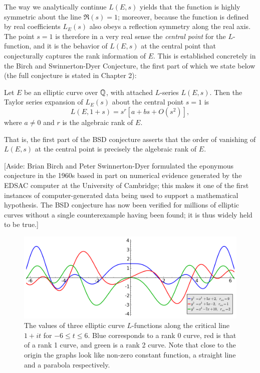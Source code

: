\documentclass[10pt]{article}
\begin{document}
The way we analytically continue $L(E,s)$ yields that the function is highly symmetric about the line $\Re(s)=1$; moreover, because the function is defined by real coefficients $L_E(s)$ also obeys a reflection symmetry along the real axis. The point $s=1$ is therefore in a very real sense the {\it central point} for the $L$-function, and it is the behavior of $L(E,s)$ at the central point that conjecturally captures the rank information of $E$. This is established concretely in the Birch and Swinnerton-Dyer Conjecture, the first part of which we state below (the full conjecture is stated in Chapter 2):

\begin{conjecture}
Let $E$ be an elliptic curve over $\mathbb{Q}$, with attached $L$-series $L(E,s)$. Then the Taylor series expansion of $L_E(s)$ about the central point $s=1$ is
\begin{equation}
L(E,1+s) = s^r\left[a  + bs + O(s^2)\right],
\end{equation}
where
$a \ne 0$ and $r$ is the algebraic rank of $E$.
\end{conjecture}
That is, the first part of the BSD conjecture asserts that the order of vanishing of $L(E,s)$ at the central point is precisely the algebraic rank of $E$.

[Aside: Brian Birch and Peter Swinnerton-Dyer formulated the eponymous conjecture in the 1960s based in part on numerical evidence generated by the EDSAC computer at the University of Cambridge; this makes it one of the first instances of computer-generated data being used to support a mathematical hypothesis. The BSD conjecture has now been verified for millions of elliptic curves without a single counterexample having been found; it is thus widely held to be true.]

\begin{figure}[!h]
    \centering
    \includegraphics[width=1.0\textwidth]{graphics/L-functions_at_origin.png}
    \caption{The values of three elliptic curve $L$-functions along the critical line $1+it$ for $-6 \le t \le 6$. Blue corresponds to a rank 0 curve, red is that of a rank 1 curve, and green is a rank 2 curve. Note that close to the origin the graphs look like non-zero constant function, a straight line and a parabola respectively.}
    \label{fig:L-functions_at_origin}
\end{figure}
\end{document}
